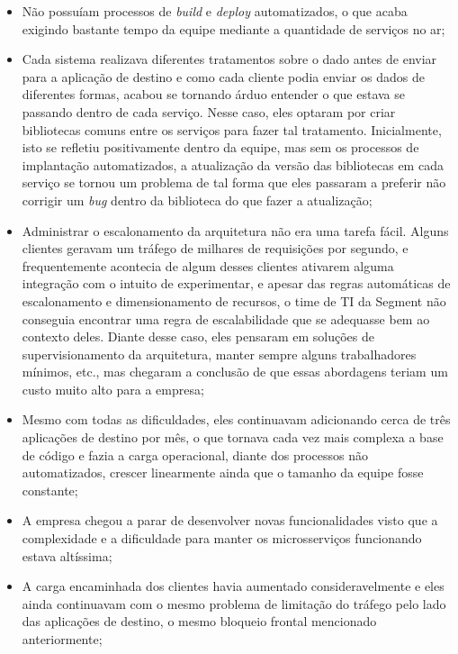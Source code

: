 \begin{itemize}
    \item Não possuíam processos de \textit{build} e \textit{deploy} automatizados, o que acaba
        exigindo bastante tempo da equipe mediante a quantidade de serviços no ar;
    \item Cada sistema realizava diferentes tratamentos sobre o dado antes de enviar para a
        aplicação de destino e como cada cliente podia enviar os dados de diferentes formas, acabou
        se tornando árduo entender o que estava se passando dentro de cada serviço. Nesse caso, eles
        optaram por criar bibliotecas comuns entre os serviços para fazer tal tratamento.
        Inicialmente, isto se refletiu positivamente dentro da equipe, mas sem os processos de
        implantação automatizados, a atualização da versão das bibliotecas em cada serviço se tornou
        um problema de tal forma que eles passaram a preferir não corrigir um \textit{bug} dentro da
        biblioteca do que fazer a atualização;
    \item Administrar o escalonamento da arquitetura não era uma tarefa fácil. Alguns clientes
        geravam um tráfego de milhares de requisições por segundo, e frequentemente acontecia de
        algum desses clientes ativarem alguma integração com o intuito de experimentar, e apesar das regras
        automáticas de escalonamento e dimensionamento de recursos, o time de \gls{TI} da Segment
        não conseguia encontrar uma regra de escalabilidade que se adequasse bem ao contexto deles.
        Diante desse caso, eles pensaram em soluções de supervisionamento da arquitetura, manter
        sempre alguns trabalhadores mínimos, etc., mas chegaram a conclusão de que essas abordagens
        teriam um custo muito alto para a empresa;
    \item Mesmo com todas as dificuldades, eles continuavam adicionando cerca de três aplicações de
        destino por mês, o que tornava cada vez mais complexa a base de código e fazia a carga
        operacional, diante dos processos não automatizados, crescer linearmente ainda que o tamanho
        da equipe fosse constante;
    \item A empresa chegou a parar de desenvolver novas funcionalidades visto que a complexidade e a
        dificuldade para manter os microsserviços funcionando estava altíssima;
    \item A carga encaminhada dos clientes havia aumentado consideravelmente e eles ainda
        continuavam com o mesmo problema de limitação do tráfego pelo lado das aplicações de
        destino, o mesmo bloqueio frontal mencionado anteriormente;
\end{itemize}

